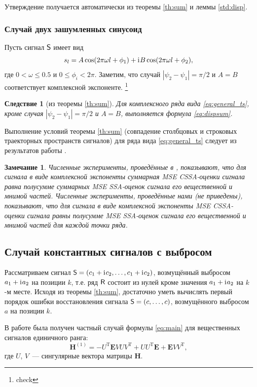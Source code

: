 \documentclass{spisok-article}
\newtheorem{corollary}{Следствие}%
\newtheorem{remark}{Замечание}%
\begin{document}
Утверждение получается автоматически из теоремы \ref{th:sum} и леммы \ref{std:disp}.

\subsubsection{Случай двух зашумленных синусоид}
Пусть сигнал $\textsf{S}$ имеет вид
\begin{equation}
\label{eq:general_ts}
s_l = A\cos(2 \pi\omega l + \phi_1) + \mathrm{i}\mkern1mu B\cos(2 \pi\omega l + \phi_2),
\end{equation} 
где $0<\omega\le 0.5$ и $0\le\phi_i < 2\pi$.
Заметим, что случай $|\psi_2-\psi_1| = \pi/2$ и $A=B$ соответствует комплексной экспоненте. \footnote{check}

\begin{corollary}[из теоремы {\ref{th:sum}}]
Для комплексного ряда вида \eqref{eq:general_ts}, кроме случая $|\psi_2-\psi_1| = \pi/2$ и $A=B$,  выполняется формула \eqref{eq:dispsum}.
\end{corollary}
Выполнение условий теоремы {\ref{th:sum}} (совпадение столбцовых и строковых траекторных пространств сигналов) для ряда вида \eqref{eq:general_ts} следует из результатов работы \cite{Golyandina.Stepanov2005}.

\begin{remark}
Численные эксперименты, проведённые в \cite{Golyandina.etal2013}, показывают, что для сигнала в виде комплексной экспоненты суммарная MSE CSSA-оценки сигнала равна полусумме суммарных MSE SSA-оценок сигнала его вещественной и мнимой частей.
Численные эксперименты, проведённые нами (не приведены), показывают, что для сигнала в виде комплексной экспоненты MSE CSSA-оценки сигнала равны полусумме MSE SSA-оценок сигнала его вещественной и мнимой частей для каждой точки ряда.
\end{remark}

\subsection{Случай константных сигналов с выбросом}
Рассматриваем сигнал $\textsf{S} = (c_1 + \mathrm{i}\mkern1mu c_2, \ldots, c_1 + \mathrm{i}\mkern1mu c_2)$, возмущённый выбросом $a_1 + \mathrm{i}\mkern1mu a_2$ на позиции $k$, т.е. ряд $\textsf{R}$ состоит из нулей кроме значения $a_1 + \mathrm{i}\mkern1mu a_2$ на $k$-м месте. Исходя из теоремы \ref{th:sum}, достаточно уметь вычислять первый порядок ошибки восстановления сигнала $\textsf{S} = (c, \ldots, c)$, возмущённого выбросом $a$ на позиции $k$.

В работе \cite{NekrutkinPerp} была получен частный случай формулы \eqref{eq:main} для вещественных сигналов единичного ранга:
$$\mathbf{H}^{(1)} = -U^{\mathrm{T}} \mathbf{E} V U V^{\mathrm{T}} + U U^{\mathrm{T}} \mathbf{E} + \mathbf{E} V V^{\mathrm{T}},$$
где $U$, $V$~--- сингулярные вектора матрицы $\mathbf{H}$.
\end{document}
